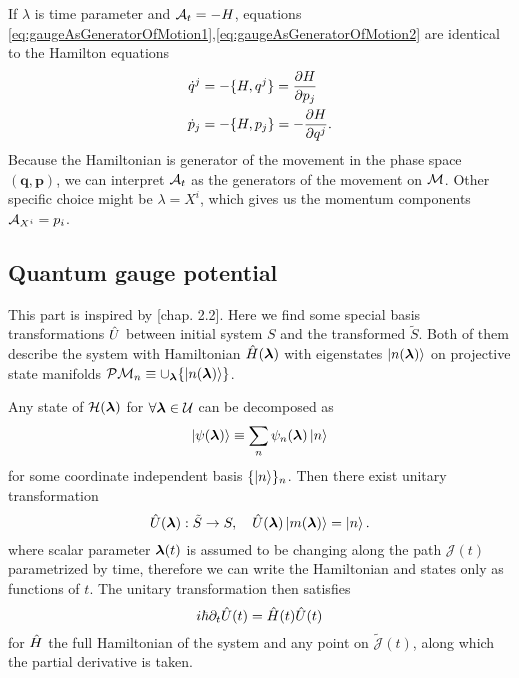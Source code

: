 If $\lambda$ is time parameter and $\mathcal{A}_t=-H$, equations \ref{eq:gaugeAsGeneratorOfMotion1},\ref{eq:gaugeAsGeneratorOfMotion2} are identical to the Hamilton equations
\begin{equation}
\begin{split}
    \dot{q}^j&=-\{H,q^j\} = \frac{\partial H}{\partial p_j}\\
    \dot{p}_j&=-\{H,p_j\} = -\frac{\partial H}{\partial q^j}.
\end{split}
\end{equation}
Because the Hamiltonian is generator of the movement in the phase space $(\bm{q},\bm{p})$, we can interpret $\mathcal{A}_t$ as the generators of the movement on $\mathcal{M}$. Other specific choice might be $\lambda=X^i$, which gives us the momentum components $\mathcal{A}_{X^i}=p_i$.



\subsection{Quantum gauge potential}
This part is inspired by \citet{kolodrubez}[chap. 2.2].
Here we find some special basis transformations $\hat{U}$ between initial system $S$ and the transformed $\tilde{S}$. Both of them describe the system with Hamiltonian $\hat{H}({\bm\lambda})$ with eigenstates $\ket{n({\bm\lambda})}$ on projective state manifolds $\mathcal{P}\mathcal{M}_n\equiv \cup_{\bm\lambda} \{\ket{n({\bm\lambda})}\}$. 

Any state of $\mathcal{H}({\bm\lambda})$ for $\forall {\bm\lambda}\in \mathcal U$ can be decomposed as
    \begin{equation}
    \ket{\psi({\bm\lambda})}\equiv \sum_n \psi_n({\bm\lambda})\ket{n}
\end{equation}    
for some coordinate independent basis $\{\ket{n}\}_n$.
Then there exist unitary transformation
\begin{equation}
    \hat{U}({\bm\lambda}): \tilde S\rightarrow S,\quad \hat{U}({\bm\lambda})\ket{m({\bm\lambda})}=\ket{n}.
    \label{eq:transformationU}
\end{equation}
where scalar parameter ${\bm\lambda}(t)$ is assumed to be changing along the path $\mathcal J(t)$ parametrized by time, therefore we can write the Hamiltonian and states only as functions of $t$. The unitary transformation then satisfies
\begin{equation}
    i\hbar \partial_t \hat{U}(t)=\hat{H}(t)\hat{U}(t)
    \label{eq:schrodingerForU}
\end{equation}
for $\hat{H}$ the full Hamiltonian of the system and any point on $\tilde{\mathcal J}(t)$, along which the partial derivative is taken.


